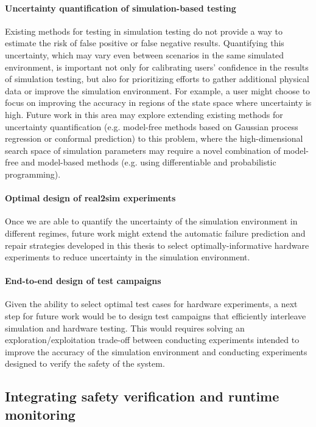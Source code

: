 \paragraph{Uncertainty quantification of simulation-based testing}
%
Existing methods for testing in simulation testing do not provide a way to estimate the risk of false positive or false negative results. Quantifying this uncertainty, which may vary even between scenarios in the same simulated environment, is important not only for calibrating users' confidence in the results of simulation testing, but also for prioritizing efforts to gather additional physical data or improve the simulation environment. For example, a user might choose to focus on improving the accuracy in regions of the state space where uncertainty is high. Future work in this area may explore extending existing methods for uncertainty quantification (e.g. model-free methods based on Gaussian process regression or conformal prediction) to this problem, where the high-dimensional search space of simulation parameters may require a novel combination of model-free and model-based methods (e.g. using differentiable and probabilistic programming).

\paragraph{Optimal design of real2sim experiments}
%
Once we are able to quantify the uncertainty of the simulation environment in different regimes, future work might extend the automatic failure prediction and repair strategies developed in this thesis to select optimally-informative hardware experiments to reduce uncertainty in the simulation environment.

\paragraph{End-to-end design of test campaigns}
Given the ability to select optimal test cases for hardware experiments, a next step for future work would be to design test campaigns that efficiently interleave simulation and hardware testing. This would requires solving an exploration/exploitation trade-off between conducting experiments intended to improve the accuracy of the simulation environment and conducting experiments designed to verify the safety of the system.

\subsection{Integrating safety verification and runtime monitoring}


